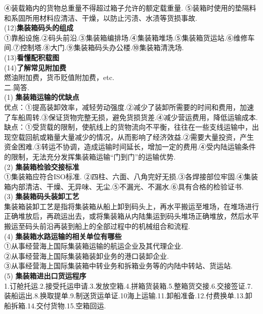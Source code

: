 \documentclass[UTF8]{ctexart}
\begin{document}
④装载箱内的货物总重量不得超过箱子允许的额定载重量.
⑤装箱时使用的垫隔料和系固所用材料应清洁、干燥，以防止污渍、水渍等货损事故.
\\
\noindent (12)\small  \textbf{集装箱码头的组成}\\ \small ①靠船设施.②码头前沿.③集装箱编排场.④集装箱堆场.⑤集装箱货运站.⑥维修车间.⑦控制塔.⑧大门.⑨集装箱码头办公楼.⑩集装箱清洗场.
\\
\noindent (13)\small  \textbf{看懂配积载图}\\ \small
\noindent (14)\small  \textbf{了解常见附加费}\\ \small 燃油附加费，货币贬值附加费，etc.
\\
二.简答.
\\ \small (1)  \textbf{集装箱运输的优缺点}\\ \small 优点：①提高装卸效率，减轻劳动强度.②减少了装卸所需要的时间和费用，加速了车船周转.③保证货物完整无损，避免货损货差.④减少营运费用，降低运输成本.缺点：①受货载的限制，使航线上的货物流向不平衡，往往在一些支线运输中，出现空载回航或箱量大量减少的情况，从而影响了经济效益.②需要大量投资，产生资金困难.③转运不协调，造成运输时间延长，增加一定的费用.④受内陆运输条件的限制，无法充分发挥集装箱运输“门到门”的运输优势.
\\
\small (2)  \textbf{集装箱检验交接标准}\\ \small ①集装箱应符合ISO标准.
②四柱、六面、八角完好无损.③各焊接部位牢固.④集装箱内部清洁、干燥、无异味、无尘.⑤不漏光、不漏水.⑥具有合格的检验证书.
\\ \small (3)  \textbf{集装箱码头装卸工艺}\\ \small 集装箱装卸工艺是指将集装箱从船上卸到码头上，再水平搬运至堆场，在堆场进行正确堆放后，再疏运出去，或将集装箱从内陆集运到码头堆场正确堆放，然后水平搬运至码头前沿再装到船上的全部过程中的机械组合和流程.
\\ \small (4)  \textbf{集装箱水路运输的相关单位有哪些}\\ \small ①从事经营海上国际集装箱运输的航运企业及其代理企业.\\②从事经营海上国际集装箱装卸业务的港口装卸企业.\\③从事经营海上国际集装箱中转业务和拆箱业务等的内陆中转站、货运站.
\\ \small (5)  \textbf{集装箱进出口货运程序}\\ \small
1.订舱托运.2.接受托运申请.3.发放空箱.4.拼箱货装箱.5.整箱货交接.6.交接签证.7.装船运出.8.换取提单.9.制送货运单证.10海上运输.11.卸船准备.12.付费换单.13.卸船拆箱.14.交付货物.15.空箱回运.
\end{document}
